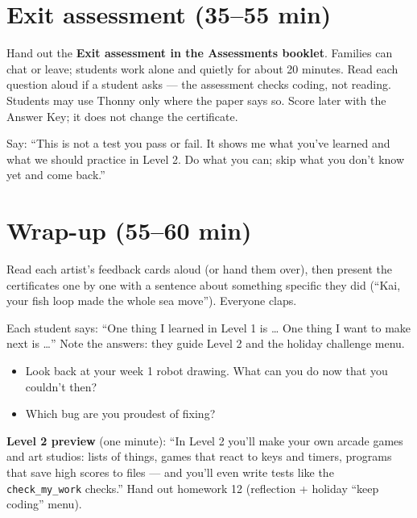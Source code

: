 \section{Exit assessment (35--55 min)}
Hand out the \textbf{Exit assessment in the Assessments booklet}. Families can chat or leave; students work alone and quietly for about 20 minutes. Read each question aloud if a student asks --- the assessment checks coding, not reading. Students may use Thonny only where the paper says so. Score later with the Answer Key; it does not change the certificate.
\begin{teachernote}
Say: \enquote{This is not a test you pass or fail. It shows me what you've learned and what we should practice in Level 2. Do what you can; skip what you don't know yet and come back.}
\end{teachernote}

\section{Wrap-up (55--60 min)}
Read each artist's feedback cards aloud (or hand them over), then present the certificates one by one with a sentence about something specific they did (\enquote{Kai, your fish loop made the whole sea move}). Everyone claps.
\begin{formativecheck}
Each student says: \enquote{One thing I learned in Level 1 is \ldots{} One thing I want to make next is \ldots} Note the answers: they guide Level 2 and the holiday challenge menu.
\end{formativecheck}
\begin{reflection}
\begin{itemize}[leftmargin=1.2em,itemsep=1pt]
  \item Look back at your week 1 robot drawing. What can you do now that you couldn't then?
  \item Which bug are you proudest of fixing?
\end{itemize}
\textbf{Level 2 preview} (one minute): \enquote{In Level 2 you'll make your own arcade games and art studios: lists of things, games that react to keys and timers, programs that save high scores to files --- and you'll even write tests like the \texttt{check\_my\_work} checks.} Hand out homework 12 (reflection + holiday \enquote{keep coding} menu).
\end{reflection}

